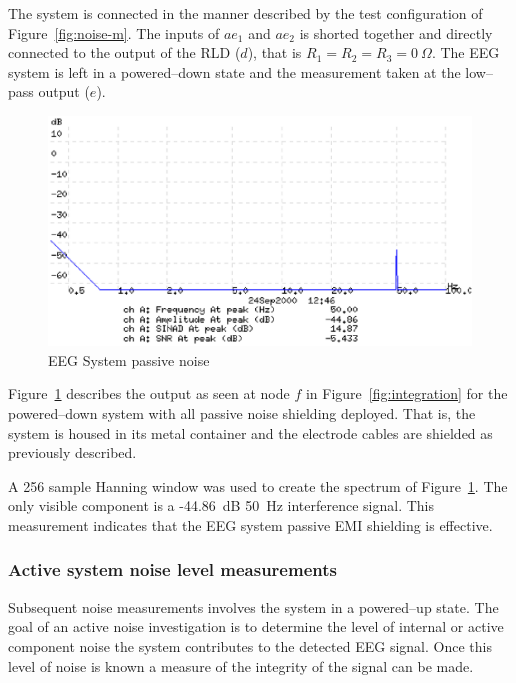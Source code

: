 The system is connected in the manner described by the test
configuration of Figure~\ref{fig:noise-m}. The inputs of $ae_1$ and
$ae_2$ is shorted together and directly connected to the output of the
RLD ($d$), that is $R_1 = R_2 = R_3 = 0~\Omega$. The EEG system is left
in a powered--down state and the measurement taken at the low--pass
output ($e$).

\begin{figure}[htbp]
\begin{center}
	\includegraphics[width=\textwidth]{SEEGNS1.ps}
    \caption{EEG System passive noise}
    \label{fig:eegnoise-passive}
\end{center}
\end{figure}


Figure~\ref{fig:eegnoise-passive} describes the output as seen at node
$f$ in Figure~\ref{fig:integration} for the powered--down system with
all passive noise shielding deployed. That is, the system is housed in
its metal container and the electrode cables are shielded as
previously described.

A 256 sample Hanning window was used to create the spectrum of
Figure~\ref{fig:eegnoise-passive}. The only visible component is a
-44.86~dB 50~Hz interference signal. This measurement indicates that
the EEG system passive EMI shielding is effective.


\subsubsection{Active system noise level measurements}

Subsequent noise measurements involves the system in a powered--up
state. The goal of an active noise investigation is to determine the
level of internal or active component noise the system contributes to
the detected EEG signal. Once this level of noise is known a measure
of the integrity of the signal can be made. 

